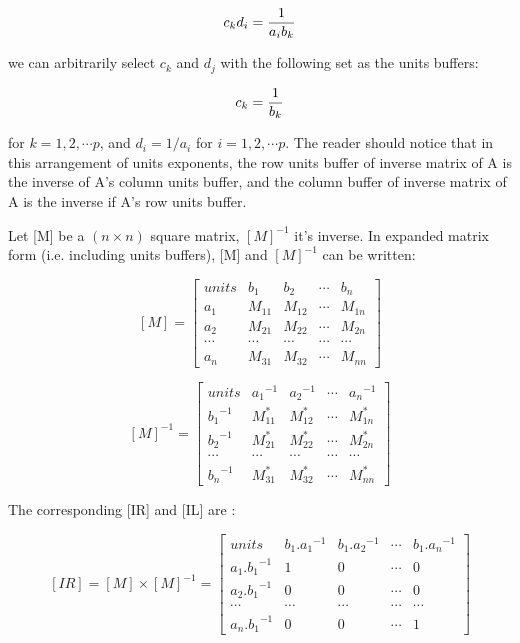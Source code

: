 \[ c_k d_i = {1 \over { a_i b_k}} \]

\vspace{0.15 in}\noindent
we can arbitrarily select $c_k$ and $d_j$
with the following set as the units buffers: 

\[ c_k = {1 \over {b_k}} \]

\vspace{0.15 in}\noindent
for $ k = 1,2, \cdots p$, and $d_i = {1/{a_i}}$ for $i = 1,2, \cdots p$.
The reader should notice that in this arrangement of units exponents,
the row units buffer of inverse matrix of A
is the inverse of A's column units buffer,
and the column buffer of inverse matrix of A
is the inverse if A's row units buffer.

\vspace{0.15 in}
\noindent\hspace{0.5 in}
Let [M] be a $(n \times n)$ square matrix, $[M]^{-1}$ it's inverse.
In expanded matrix form (i.e. including units buffers),
[M] and $[M]^{-1}$ can be written:

\[ [M] =  \left [
\begin{array}{rrrrr}
units  & b_1     & b_2    & \cdots & b_n    \\
a_1    &  M_{11} & M_{12} & \cdots & M_{1n} \\
a_2    &  M_{21} & M_{22} & \cdots & M_{2n} \\
\cdots &  \cdots & \cdots & \cdots & \cdots \\
a_n    &  M_{31} & M_{32} & \cdots & M_{nn}
\end{array}
\right]
 \]

\[ [M]^{-1} =  \left [
\begin{array}{rrrrr}
units      & {a_1}^{-1} & {a_2}^{-1} & \cdots & {a_n}^{-1} \\
{b_1}^{-1} &  M^*_{11}  & M^*_{12}   & \cdots & M^*_{1n}   \\
{b_2}^{-1} &  M^*_{21}  & M^*_{22}   & \cdots & M^*_{2n}   \\
\cdots     &  \cdots    & \cdots     & \cdots & \cdots     \\
{b_n}^{-1} &  M^*_{31}  & M^*_{32}   & \cdots & M^*_{nn}
\end{array}
\right]
 \]

\vspace{0.15 in}\noindent
The corresponding [IR] and [IL] are :

\[ [IR] = [M]\times [M]^{-1} 
 = \left [  
\begin{array}{rrrrr}
units           & b_1.{a_1}^{-1} & b_1.{a_2}^{-1} & \cdots & b_1.{a_n}^{-1}    \\
a_1.{b_1}^{-1}  &  1             & 0              & \cdots & 0      \\
a_2.{b_1}^{-1}  &  0             & 0              & \cdots & 0      \\
\cdots          &  \cdots        & \cdots         & \cdots & \cdots \\
a_n.{b_1}^{-1}  &  0             & 0              & \cdots & 1
\end{array} 
\right ]  
\]


